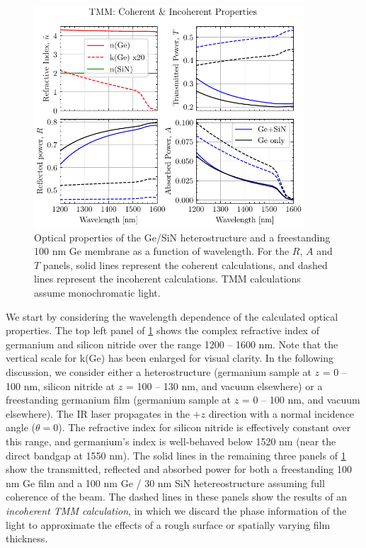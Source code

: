 \begin{figure}
	\centering
	\includegraphics[width=0.9\textwidth]{figures/chap4/tmm_vs_WL_1200-1600nm.pdf}
	\caption{Optical properties of the Ge/SiN heterostructure and a freestanding 100 nm Ge membrane as a function of wavelength. For the $R$, $A$ and $T$ panels, solid lines represent the coherent calculations, and dashed lines represent the incoherent calculations. TMM calculations assume monochromatic light.}
	\label{fig:tmm_vs_WL_1200-1600nm}
\end{figure}

We start by considering the wavelength dependence of the calculated optical properties. The top left panel of \cref{fig:tmm_vs_WL_1200-1600nm} shows the complex refractive index of germanium and silicon nitride over the range 1200 -- 1600 nm. Note that the vertical scale for k(Ge) has been enlarged for visual clarity. In the following discussion, we consider either a heterostructure (germanium sample at {$z$ = 0 -- 100 nm}, silicon nitride at {$z$ = 100 -- 130 nm}, and vacuum elsewhere) or a freestanding germanium film (germanium sample at {$z$ = 0 -- 100 nm}, and vacuum elsewhere). The IR laser propagates in the $+z$ direction with a normal incidence angle ($\theta = 0$). The refractive index for silicon nitride is effectively constant over this range, and germanium's index is well-behaved below 1520 nm (near the direct bandgap at 1550 nm). The solid lines in the remaining three panels of \cref{fig:tmm_vs_WL_1200-1600nm} show the transmitted, reflected and absorbed power for both a freestanding 100 nm Ge film and a 100 nm Ge / 30 nm SiN hetereostructure assuming full coherence of the beam. The dashed lines in these panels show the results of an \textit{incoherent TMM calculation}, in which we discard the phase information of the light to approximate the effects of a rough surface or spatially varying film thickness.


